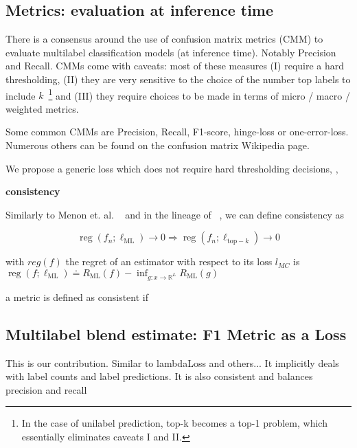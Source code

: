 \subsection{Metrics: evaluation at inference time}
\label{section:background:metrics}

There is a consensus around the use of confusion matrix metrics (CMM) to evaluate multilabel classification models (at inference time). Notably Precision and Recall. CMMs come with caveats: most of these measures (I) require a hard thresholding, (II) they are very sensitive to the choice of the number top labels to include $k$~\footnote{In the case of unilabel prediction, top-k becomes a top-1 problem, which essentially eliminates caveats I and II.} and (III) they require choices to be made in terms of  micro / macro / weighted metrics.

Some common CMMs are Precision, Recall, F1-score, hinge-loss or one-error-loss. Numerous others can be found on the confusion matrix Wikipedia page.


We propose a generic loss which does not require hard thresholding decisions, , 


\textbf{consistency}

Similarly to Menon et. al. ~\citep{multilabelReduction} and in the lineage of ~\citep{consistency-surrogates, consistency-multiclassSVM, consistency-lossAnalysis}, we can define consistency as

\begin{equation}
\operatorname{reg}\left(f_{n} ; \ell_{\mathrm{ML}}\right) \rightarrow 0 \Longrightarrow \operatorname{reg}\left(f_{n} ; \ell_{\mathrm{top}-k}\right) \rightarrow 0
\end{equation}

with $reg(f)$ the regret of an estimator with respect to its loss $l_{MC}$ is $\operatorname{reg}\left(f ; \ell_{\mathrm{ML}}\right) \doteq R_{\mathrm{ML}}(f)-\inf _{g: x \rightarrow \mathbb{R}^{L}} R_{\mathrm{ML}}(g)$

a metric is defined as consistent if 


\subsection{Multilabel blend estimate: F1 Metric as a Loss}
\label{section:background:metricsAsLosses}

This is our contribution. Similar to lambdaLoss and others... It implicitly deals with label counts and label predictions. It is also consistent and balances precision and recall 



